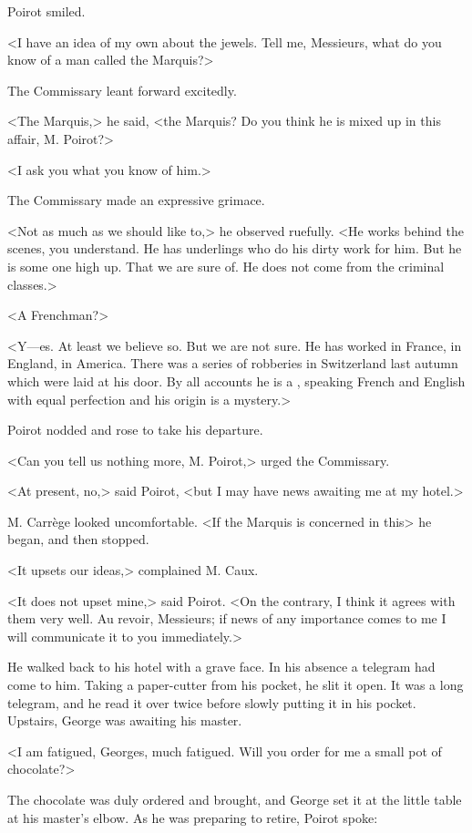 Poirot smiled.

<I have an idea of my own about the jewels. Tell me, Messieurs, what do you know of a man called the Marquis?>

The Commissary leant forward excitedly.

<The Marquis,> he said, <the Marquis? Do you think he is mixed up in this affair, M. Poirot?>

<I ask you what you know of him.>

The Commissary made an expressive grimace.

<Not as much as we should like to,> he observed ruefully. <He works behind the scenes, you understand. He has underlings who do his dirty work for him. But he is some one high up. That we are sure of. He does not come from the criminal classes.>

<A Frenchman?>

<Y—es. At least we believe so. But we are not sure. He has worked in France, in England, in America. There was a series of robberies in Switzerland last autumn which were laid at his door. By all accounts he is a , speaking French and English with equal perfection and his origin is a mystery.>

Poirot nodded and rose to take his departure.

<Can you tell us nothing more, M. Poirot,> urged the Commissary.

<At present, no,> said Poirot, <but I may have news awaiting me at my hotel.>

M. Carrège looked uncomfortable. <If the Marquis is concerned in this\longdash> he began, and then stopped.

<It upsets our ideas,> complained M. Caux.

<It does not upset mine,> said Poirot. <On the contrary, I think it agrees with them very well. Au revoir, Messieurs; if news of any importance comes to me I will communicate it to you immediately.>

He walked back to his hotel with a grave face. In his absence a telegram had come to him. Taking a paper-cutter from his pocket, he slit it open. It was a long telegram, and he read it over twice before slowly putting it in his pocket. Upstairs, George was awaiting his master.

<I am fatigued, Georges, much fatigued. Will you order for me a small pot of chocolate?>

The chocolate was duly ordered and brought, and George set it at the little table at his master's elbow. As he was preparing to retire, Poirot spoke:


